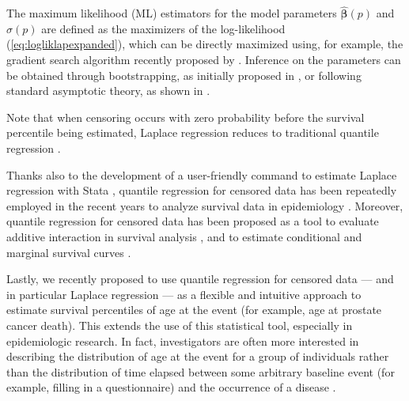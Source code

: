 The maximum likelihood (ML) estimators for the model parameters $\hat{\boldsymbol{\beta}}(p)$ and $\hat{\sigma}(p)$ are defined as the maximizers of the log-likelihood (\ref{eq:logliklapexpanded}), which can be directly maximized using, for example, the gradient search algorithm recently proposed by \citet*{bottai_gradient_2015}. %
Inference on the parameters can be obtained through bootstrapping, as initially proposed in \citet{bottai_laplace_2010}, or following standard asymptotic theory, as shown in  \citet{bottai_command_2013}.

Note that when censoring occurs with zero probability before the survival percentile being estimated, Laplace regression reduces to traditional quantile regression \citep{bottai_laplace_2010}.

Thanks also to the development of a user-friendly command to estimate Laplace regression with Stata \citep{bottai_command_2013}, quantile regression for censored data has been repeatedly employed in the recent years to analyze survival data in epidemiology \citep[see, for example,][]{rizzuto_lifestyle_2012, bellavia_sleep_2014, rahman_relationship_2014}. %
Moreover, quantile regression for censored data has been proposed as a tool to evaluate additive interaction in survival analysis \citep{bellavia_evaluating_2016}, and to estimate conditional and marginal survival curves \citep{bellavia_adjusted_2015}. 

Lastly, we recently proposed to use quantile regression for censored data --- and in particular Laplace regression --- as a flexible and intuitive approach to estimate survival percentiles of age at the event (for example, age at prostate cancer death). This extends the use of this statistical tool, especially in epidemiologic research. In fact, investigators are often more interested in describing the distribution of age at the event for a group of individuals rather than the distribution of time elapsed between some arbitrary baseline event (for example, filling in a questionnaire) and the occurrence of a disease . 


